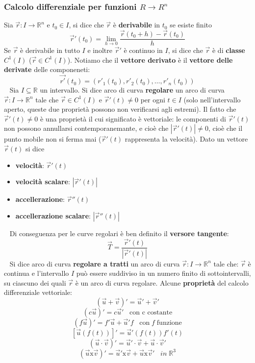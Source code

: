 \subsubsection{Calcolo differenziale per funzioni $R \rightarrow R^n$}
Sia $\vec{r}: I \rightarrow \mathbb{R}^n$ e $t_0 \in I$, si dice che $\vec{r}$ è \textbf{derivabile} in $t_0$ se esiste finito
\[
    \vec{r}'(t_0) = \lim_{h\rightarrow 0}\frac{\vec{r}(t_0 +h) - \vec{r}(t_0)}{h}
\]
Se $\vec{r}$ è derivabile in tutto $I$ e inoltre $\vec{r}'$ è continuo in $I$, si dice che $\vec{r}$ è di \textbf{classe} $C^1(I)$ ($\vec{r}\in C^1(I)$).
\newline
\newline
Notiamo che il \textbf{vettore derivato} è il \textbf{vettore delle derivate} delle componeneti:
\[
    \vec{r'}(t_0) = (r'_1(t_0), r'_2(t_0), \dots, r'_n(t_0))
\]
\ \newline
Sia $I \subseteq \mathbb{R}$ un intervallo. Si dice arco di curva \textbf{regolare} un arco di curva $\vec{r}: I \rightarrow  \mathbb{R}^n$ tale che $\vec{r} \in C^1(I)$ e $\vec{r}'(t) \neq 0$ per ogni $t \in I$ (solo nell'intervallo aperto, queste due proprietà possono non verificarsi agli estremi).\newline
Il fatto che $\vec{r}' (t) \neq 0$ è una proprietà il cui significato è vettoriale: le componenti di $\vec{r}'(t)$ non possono annullarsi contemporanemante, e cioè che $|\vec{r}'(t)|\neq 0$, cioè che il punto mobile non si ferma mai ($\vec{r}'(t)$ rappresenta la velocità).\newline
\newline
Dato un vettore $\vec{r}(t)$ si dice
\begin{itemize}
    \item \textbf{velocità}: $\vec{r}'(t)$
    \item \textbf{velocità scalare}: $|\vec{r}'(t)|$
    \item \textbf{accellerazione}: $\vec{r}''(t)$
    \item \textbf{accellerazione scalare}: $|\vec{r}''(t)|$
\end{itemize}
\ \newline
Di conseguenza per le curve regolari è ben definito il \textbf{versore tangente}:
\[
    \vec{T} = \frac{\vec{r}'(t)}{|\vec{r}'(t)|}
\]
\ \newline
Si dice arco di curva \textbf{regolare a tratti} un arco di curva $\vec{r} : I \rightarrow \mathbb{R}^n$ tale che: $\vec{r}$ è continua e l'intervallo $I$ può essere suddiviso in un numero finito di sottointervalli, su ciascuno dei quali $\vec{r}$ è un arco di curva regolare.\newline
\newline
Alcune \textbf{proprietà} del calcolo differenziale vettoriale:
\[
    (\vec{u} + \vec{v})' = \vec{u}' + \vec{v}'
\]
\[
    (c \vec{u})' = c \vec{u}' \;\;\; \text{con c costante}
\]
\[
    (f \vec{u})' = f' \vec{u} + \vec{u}' f \;\;\;\text{con} \; f \; \text{funzione}
\]
\[
    [\vec{u}(f(t))]' = \vec{u}'(f(t))f'(t)
\]
\[
    (\vec{u} \cdot \vec{v})' = \vec{u}' \cdot  \vec{v} + \vec{u} \cdot  \vec{v}'
\]
\[
    (\vec{u} \text{x} \vec{v})' = \vec{u}' \text{x} \vec{v} + \vec{u} \text{x} \vec{v}' \;\;\; in \;\mathbb{R}^3
\]
